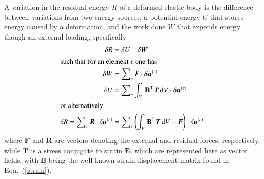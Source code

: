 A variation in the residual energy $R$ of a deformed elastic body is the difference between variations from two energy sources: a potential energy $U$ that stores energy caused by a deformation, and the work done $W$ that expends energy though an external loading, specifically \cite{Yangetal10}
\begin{subequations}
    \label{principle}
    \begin{align}
    \delta{R} &= \delta{U} - \delta{W} \\
    \intertext{such that for an element $e$ one has}
    \delta{W} & = \sum\nolimits_e \boldsymbol{F} \cdot \delta\boldsymbol{u}^{(e)} \\
    \delta{U} & = \sum\nolimits_e \int_{V} \, \mathbf{B}^{\mathsf{T}} \,
    \boldsymbol{T} \, \mathrm{d} V \cdot \delta\boldsymbol{u}^{(e)} \\
    \intertext{or alternatively}
    \delta R = \sum\nolimits_e \boldsymbol{R} \cdot \delta \boldsymbol{u}^{(e)} & = 
    \sum\nolimits_e \left( \int_V \mathbf{B}^{\mathsf{T}} \, \boldsymbol{T} \, \mathrm{d}V - 
    \boldsymbol{F} \right) \cdot \delta \boldsymbol{u}^{(e)} 
    \label{residualVariation}
    \end{align}
\end{subequations}
where $\boldsymbol{F}$ and $\boldsymbol{R}$ are vectors denoting the external and residual forces, respectively, while $\boldsymbol{T}$ is a stress conjugate to strain $\boldsymbol{E}$, which are represented here as vector fields, with $\mathbf{B}$ being the well-known strain-displacement matrix found in Eqn.~(\ref{strain}).

